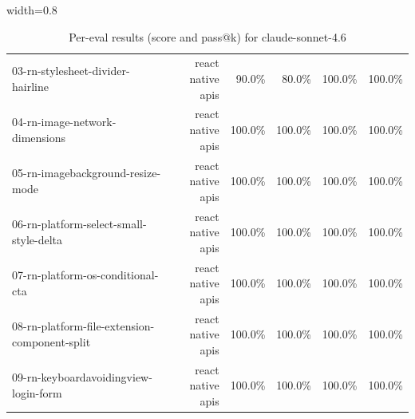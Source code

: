 \begin{table}[htbp]
\begin{adjustbox}{width=0.8\textwidth}
\begin{tabular}{lrrrrr}
03-rn-stylesheet-divider-hairline & react native apis & 90.0\% & 80.0\% & 100.0\% & 100.0\% \\
04-rn-image-network-dimensions & react native apis & 100.0\% & 100.0\% & 100.0\% & 100.0\% \\
05-rn-imagebackground-resize-mode & react native apis & 100.0\% & 100.0\% & 100.0\% & 100.0\% \\
06-rn-platform-select-small-style-delta & react native apis & 100.0\% & 100.0\% & 100.0\% & 100.0\% \\
07-rn-platform-os-conditional-cta & react native apis & 100.0\% & 100.0\% & 100.0\% & 100.0\% \\
08-rn-platform-file-extension-component-split & react native apis & 100.0\% & 100.0\% & 100.0\% & 100.0\% \\
09-rn-keyboardavoidingview-login-form & react native apis & 100.0\% & 100.0\% & 100.0\% & 100.0\% \\
\bottomrule
\end{tabular}
\end{adjustbox}
\caption{Per-eval results (score and pass@k) for claude-sonnet-4.6}
\end{table}
